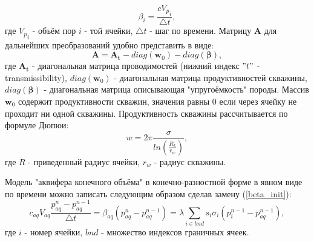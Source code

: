 \documentclass[14pt]{article}
\begin{document}
\begin{equation} \label{beta_init}
 \beta_i = \frac{c {V_p}_i}{\bigtriangleup t},
\end{equation} 
где $ {V_p}_i $ - объём пор $ i $ - той ячейки, ${\bigtriangleup t}$ - шаг по времени.
Матрицу $\boldsymbol{A}$ для дальнейших преобразований удобно представить в виде:
\begin{equation} \label{A_diag}
\boldsymbol{A} = \boldsymbol{A_t} - diag\left(\boldsymbol{w}_0\right) - diag\left(\boldsymbol{\beta}\right),
\end{equation}
где $ \boldsymbol{A_t} $ - диагональная матрица проводимостей (нижний индекс $ "t" $ -transmissibility), $ diag\left(\boldsymbol{w}_0\right) $ - диагональная матрица продуктивностей скважины, $ diag\left(\boldsymbol{\beta}\right) $ - диагональная матрица описывающая "упругоёмкость" породы. Массив $\boldsymbol{w}_0$ содержит продуктивности скважин, значения равны 0 если через ячейку не проходит ни одной скважины. Продуктивность скважины рассчитывается по формуле Дюпюи:
\begin{equation} \label{WI}
w = 2 \pi\frac{\sigma}{ln\left(\frac{R_k}{r_w}\right)},
\end{equation} 
где $ R $ - приведенный радиус ячейки, $ r_w $ - радиус скважины.

Модель "аквифера конечного объёма" в конечно-разностной форме в явном виде по времени можно записать следующим образом сделав замену (\ref{beta_init}): 
\begin{equation} \label{aq_num}
c_{aq} V_{aq}\frac{p_{aq}^n - p_{aq}^{n-1}}{\bigtriangleup t} = 
\beta_{aq}(p_{aq}^n - p_{aq}^{n-1}) =  
\lambda\sum_{i \in bnd}s_i\sigma_i(p_i^{n-1}-p_{aq}^{n-1}),
\end{equation}
где $ i $ - номер ячейки, $bnd$ - множество индексов граничных ячеек.
\end{document}
